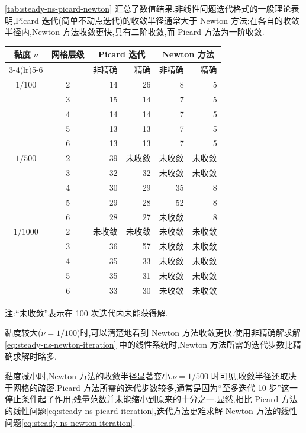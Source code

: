 \begin{example}
\cref{tab:steady-ns-picard-newton} 汇总了数值结果.非线性问题迭代格式的一般理论表明,Picard 迭代(简单不动点迭代)的收敛半径通常大于 Newton 方法;在各自的收敛半径内,Newton 方法收敛更快,具有二阶收敛,而 Picard 方法为一阶收敛.
\begin{center}
\small
\setlength{\tabcolsep}{5pt}
\renewcommand{\arraystretch}{1.08}
\begin{tabular}{ccrrrr}
\toprule
黏度 $\nu$ & 网格层级
  & \multicolumn{2}{c}{Picard 迭代}
  & \multicolumn{2}{c}{Newton 方法}\\
\cmidrule(lr){3-4}\cmidrule(lr){5-6}
 & & 非精确 & 精确 & 非精确 & 精确\\
\midrule
$1/100$  & 2 & 14 & 26 & 8  & 5\\
         & 3 & 15 & 14 & 7  & 5\\
         & 4 & 14 & 14 & 7  & 5\\
         & 5 & 13 & 13 & 7  & 5\\
         & 6 & 13 & 13 & 7  & 5\\
\midrule
$1/500$  & 2 & 39 & 未收敛 & 未收敛 & 未收敛\\
         & 3 & 32 & 32 & 未收敛 & 未收敛\\
         & 4 & 30 & 29 & 35 & 8\\
         & 5 & 29 & 28 & 52 & 8\\
         & 6 & 28 & 27 & 未收敛 & 8\\
\midrule
$1/1000$ & 2 & 未收敛 & 未收敛 & 未收敛 & 未收敛\\
         & 3 & 36 & 57 & 未收敛 & 未收敛\\
         & 4 & 35 & 33 & 未收敛 & 未收敛\\
         & 5 & 35 & 31 & 未收敛 & 未收敛\\
         & 6 & 33 & 30 & 未收敛 & 未收敛\\
\bottomrule
\end{tabular}
\label{tab:steady-ns-picard-newton}
\end{center}
\noindent 注:“未收敛”表示在 100 次迭代内未能获得解.

黏度较大($\nu=1/100$)时,可以清楚地看到 Newton 方法收敛更快.使用非精确解求解\cref{eq:steady-ns-newton-iteration} 中的线性系统时,Newton 方法所需的迭代步数比精确求解时略多.

黏度减小时,Newton 方法的收敛半径显著变小.$\nu=1/500$ 时可见,收敛半径还取决于网格的疏密.Picard 方法所需的迭代步数较多,通常是因为“至多迭代 10 步”这一停止条件起了作用;残量范数并未能缩小到原来的十分之一.显然,相比 Picard 方法的线性问题\cref{eq:steady-ns-picard-iteration},迭代方法更难求解 Newton 方法的线性问题\cref{eq:steady-ns-newton-iteration}.


\end{example}
